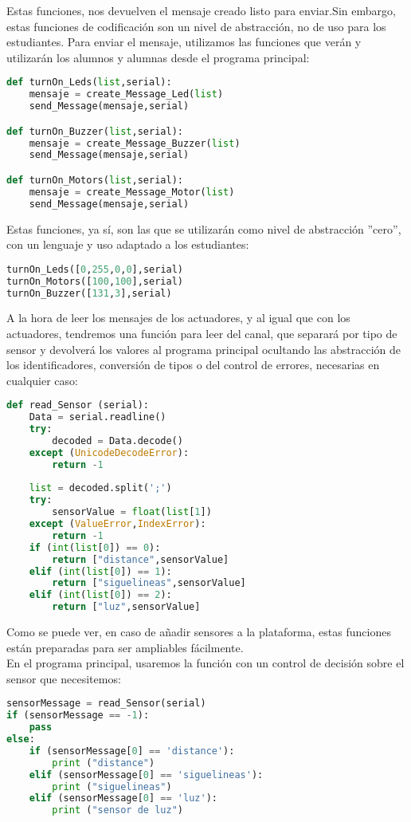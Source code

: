 Estas funciones, nos devuelven el mensaje creado listo para enviar.Sin embargo, estas funciones de codificación son un nivel de abstracción, no de uso para los estudiantes. Para enviar el mensaje, utilizamos las funciones que verán y utilizarán los alumnos y alumnas desde el programa principal:
\begin{lstlisting}[language=python,caption={Funciones en la biblioteca PC para el envío de mensajes a los actuadores},captionpos=b]
def turnOn_Leds(list,serial):
	mensaje = create_Message_Led(list)
	send_Message(mensaje,serial)

def turnOn_Buzzer(list,serial):
	mensaje = create_Message_Buzzer(list)
	send_Message(mensaje,serial)

def turnOn_Motors(list,serial):
	mensaje = create_Message_Motor(list)
	send_Message(mensaje,serial)
\end{lstlisting}

Estas funciones, ya sí, son las que se utilizarán como nivel de abstracción ''cero'', con un lenguaje y uso adaptado a los estudiantes:
\begin{lstlisting}[language=python,caption={Uso de los actuadores desde el Programa Principal},captionpos=b]
turnOn_Leds([0,255,0,0],serial)
turnOn_Motors([100,100],serial)
turnOn_Buzzer([131,3],serial)
\end{lstlisting}

A la hora de leer los mensajes de los actuadores, y al igual que con los actuadores, tendremos una función para leer del canal, que separará por tipo de sensor y devolverá los valores al programa principal ocultando las abstracción de los identificadores, conversión de tipos o del control de errores, necesarias en cualquier caso:
\begin{lstlisting}[language=python,caption={Lectura de los sensores en la biblioteca PC},captionpos=b]
def read_Sensor (serial):
	Data = serial.readline()
	try:
		decoded = Data.decode()
	except (UnicodeDecodeError):
		return -1 
	
	list = decoded.split(';')
	try:
		sensorValue = float(list[1])
	except (ValueError,IndexError):
		return -1 
	if (int(list[0]) == 0):
		return ["distance",sensorValue]
	elif (int(list[0]) == 1):
		return ["siguelineas",sensorValue]
	elif (int(list[0]) == 2):
		return ["luz",sensorValue]
\end{lstlisting}
Como se puede ver, en caso de añadir sensores a la plataforma, estas funciones están preparadas para ser ampliables fácilmente.\\
En el programa principal, usaremos la función con un control de decisión sobre el sensor que necesitemos:
\begin{lstlisting}[language=python,caption={Lectura de sensores en el Programa Principal},captionpos=b]
sensorMessage = read_Sensor(serial)
if (sensorMessage == -1):
	pass
else:
	if (sensorMessage[0] == 'distance'):
		print ("distance")
	elif (sensorMessage[0] == 'siguelineas'):
		print ("siguelineas")
	elif (sensorMessage[0] == 'luz'):
		print ("sensor de luz")
		
\end{lstlisting}


